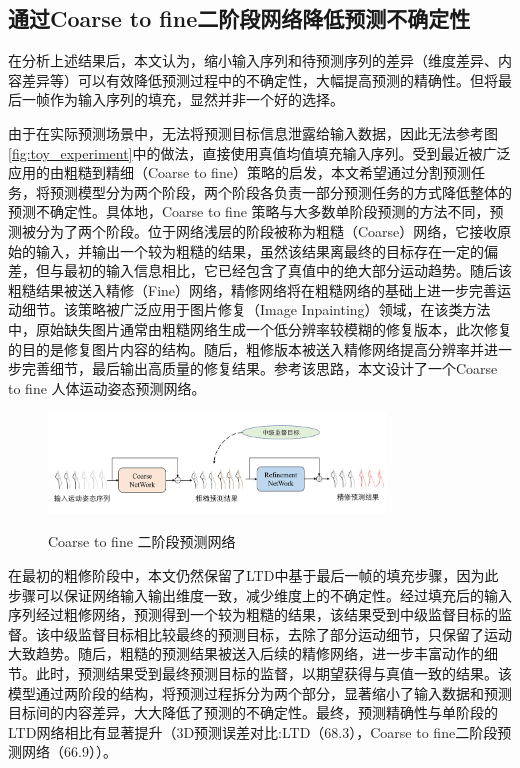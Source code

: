 \subsection{通过Coarse to fine二阶段网络降低预测不确定性}
在分析上述结果后，本文认为，缩小输入序列和待预测序列的差异（维度差异、内容差异等）可以有效降低预测过程中的不确定性，大幅提高预测的精确性。但将最后一帧作为输入序列的填充，显然并非一个好的选择。

由于在实际预测场景中，无法将预测目标信息泄露给输入数据，因此无法参考图\ref{fig:toy_experiment}中的做法，直接使用真值均值填充输入序列。受到最近被广泛应用的由粗糙到精细（Coarse to fine）策略的启发，本文希望通过分割预测任务，将预测模型分为两个阶段，两个阶段各负责一部分预测任务的方式降低整体的预测不确定性。具体地，Coarse to fine 策略与大多数单阶段预测的方法不同，预测被分为了两个阶段。位于网络浅层的阶段被称为粗糙（Coarse）网络，它接收原始的输入，并输出一个较为粗糙的结果，虽然该结果离最终的目标存在一定的偏差，但与最初的输入信息相比，它已经包含了真值中的绝大部分运动趋势。随后该粗糙结果被送入精修（Fine）网络，精修网络将在粗糙网络的基础上进一步完善运动细节。该策略被广泛应用于图片修复（Image Inpainting）\parencite{yu2018generative,zamir2021multi}领域，在该类方法中，原始缺失图片通常由粗糙网络生成一个低分辨率较模糊的修复版本，此次修复的目的是修复图片内容的结构。随后，粗修版本被送入精修网络提高分辨率并进一步完善细节，最后输出高质量的修复结果。参考该思路，本文设计了一个Coarse to fine 人体运动姿态预测网络。

\begin{figure}[ht]
    \centering
    \includegraphics[width=0.8\textwidth]{FigMa/Two_stage.png}\\
    \vspace{-0.3cm}
    \caption{Coarse to fine 二阶段预测网络}
    \label{fig:Two_stage}
\end{figure}

在最初的粗修阶段中，本文仍然保留了LTD中基于最后一帧的填充步骤，因为此步骤可以保证网络输入输出维度一致，减少维度上的不确定性。经过填充后的输入序列经过粗修网络，预测得到一个较为粗糙的结果，该结果受到中级监督目标的监督。该中级监督目标相比较最终的预测目标，去除了部分运动细节，只保留了运动大致趋势。随后，粗糙的预测结果被送入后续的精修网络，进一步丰富动作的细节。此时，预测结果受到最终预测目标的监督，以期望获得与真值一致的结果。该模型通过两阶段的结构，将预测过程拆分为两个部分，显著缩小了输入数据和预测目标间的内容差异，大大降低了预测的不确定性。最终，预测精确性与单阶段的LTD网络相比有显著提升（3D预测误差对比:LTD（68.3），Coarse to fine二阶段预测网络（66.9））。
